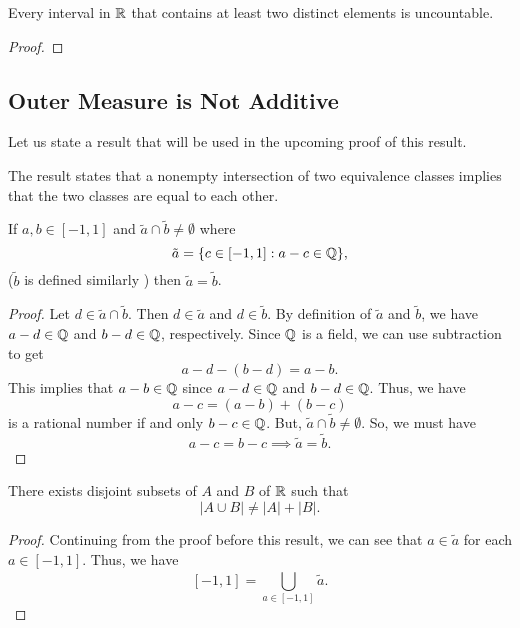 \documentclass[11pt,a4paper]{book}
\begin{document}
\begin{prop}
   Every interval in \( \mathbb{R}  \) that contains at least two distinct elements is uncountable. 
\end{prop}
\begin{proof}

\end{proof}

\subsection{Outer Measure is Not Additive}

Let us state a result that will be used in the upcoming proof of this result.

The result states that a nonempty intersection of two equivalence classes implies that the two classes are equal to each other. 

\begin{prop}
    If \( a,b \in [-1,1] \) and \(  \tilde{a} \cap \tilde{b} \neq \emptyset  \) where  
    \[  \tilde{a} = \{ c \in [-1,1] : a - c \in \mathbb{Q}  \},  \]
    (\( \tilde{b}  \) is defined similarly ) then \( \tilde{a} = \tilde{b}  \).
\end{prop}
\begin{proof}
Let \( d \in \tilde{a} \cap \tilde{b} \). Then \( d \in \tilde{a} \) and \( d \in \tilde{b} \). By definition of \( \tilde{a}  \) and \( \tilde{b} \), we have \( a - d \in \mathbb{Q}  \) and \(  b - d \in \mathbb{Q}  \), respectively. Since \( \mathbb{Q}  \) is a field, we can use subtraction to get 
\[  a - d - (b-d) = a - b. \]
This implies that \( a - b \in \mathbb{Q}  \) since \( a - d \in \mathbb{Q}  \) and \( b - d \in \mathbb{Q}  \). Thus, we have 
\[  a - c = (a-b) + (b-c)  \] is a rational number if and only \(  b - c \in \mathbb{Q}  \). But, \( \tilde{a} \cap \tilde{b} \neq \emptyset \). So, we must have 
\[  a - c = b - c \implies \tilde{a} = \tilde{b}. \]
\end{proof}


\begin{prop}\label{Nonadditivity of Outer Measure}
   There exists disjoint subsets of \( A  \) and \( B  \) of \( \mathbb{R}  \) such that 
   \[  | A \cup B  | \neq | A  |  + | B  |. \]
\end{prop}
\begin{proof}
    Continuing from the proof before this result, we can see that \( a \in \tilde{a} \) for each \( a \in [-1,1] \). Thus, we have 
    \[  [-1,1] = \bigcup_{ a \in [-1,1] }^{  }  \tilde{a}. \]
\end{proof}
\end{document}
